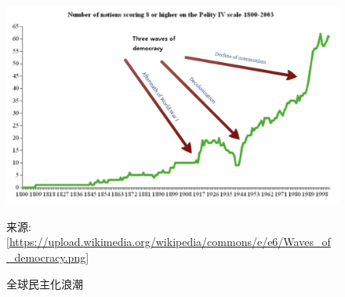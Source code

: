 \documentclass[a5paper, 11pt, openany]{ctexbook}
\begin{document}
\begin{figure}[htbp]
    \centering
    \includegraphics[width=\textwidth]{Waves_of_democracy.png} %
    \caption{全球民主化浪潮}
    \small
    来源: [\url{https://upload.wikimedia.org/wikipedia/commons/e/e6/Waves_of_democracy.png}]
    \label{fig:democracy_waves}
\end{figure}
\end{document}
